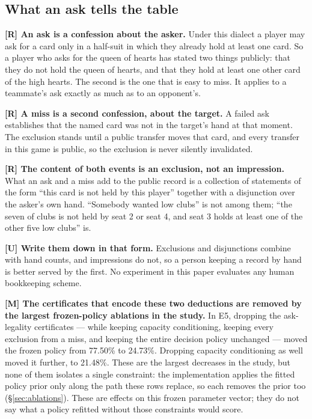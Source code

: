 \documentclass[11pt]{article}
\theoremstyle{definition}
\newcommand{\numAblRef}{77.50}
\newcommand{\numAblCFourAbs}{21.48}
\newcommand{\numAblSinkhornAbs}{24.73}
\begin{document}
\subsection{What an ask tells the table}
\label{app:human-ask}

\textbf{[R] An ask is a confession about the asker.} Under this dialect a
player may ask for a card only in a half-suit in which they already hold at
least one card. So a player who asks for the queen of hearts has stated two
things publicly: that they do not hold the queen of hearts, and that they hold
at least one other card of the high hearts. The second is the one that is easy
to miss. It applies to a teammate's ask exactly as much as to an opponent's.

\textbf{[R] A miss is a second confession, about the target.} A failed ask
establishes that the named card was not in the target's hand at that moment. The
exclusion stands until a public transfer moves that card, and every transfer in
this game is public, so the exclusion is never silently invalidated.

\textbf{[R] The content of both events is an exclusion, not an impression.}
What an ask and a miss add to the public record is a collection of statements of the
form ``this card is not held by this player'' together with a disjunction over
the asker's own hand. ``Somebody wanted low clubs'' is not among them; ``the
seven of clubs is not held by seat 2 or seat 4, and seat 3 holds at least one of
the other five low clubs'' is.

\textbf{[U] Write them down in that form.} Exclusions and disjunctions combine
with hand counts, and impressions do not, so a person keeping a record by hand
is better served by the first. No experiment in this paper evaluates any human
bookkeeping scheme.

\textbf{[M] The certificates that encode these two deductions are removed by the
largest frozen-policy ablations in the study.} In E5, dropping the ask-legality
certificates --- while keeping capacity conditioning, keeping every exclusion
from a miss, and keeping the entire decision policy unchanged --- moved the
frozen policy from \numAblRef\% to \numAblSinkhornAbs\%. Dropping capacity
conditioning as well moved it further, to \numAblCFourAbs\%. These are the
largest decreases in the study, but none of them isolates a single constraint:
the implementation applies the fitted policy prior only along the path these
rows replace, so each removes the prior too (\S\ref{sec:ablations}).
These are effects on this
frozen parameter vector; they do not say what a policy refitted without those
constraints would score.
\end{document}
